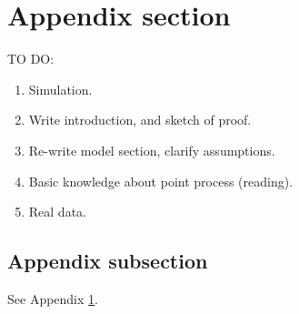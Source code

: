 
\appendix

\section{Appendix section}\label{app}

TO DO:
\begin{enumerate}
\item Simulation.
\item Write introduction, and sketch of proof.
\item Re-write model section, clarify assumptions.
\item Basic knowledge about point process (reading).
\item Real data.
\end{enumerate}

\subsection{Appendix subsection}

See Appendix \ref{app}.
